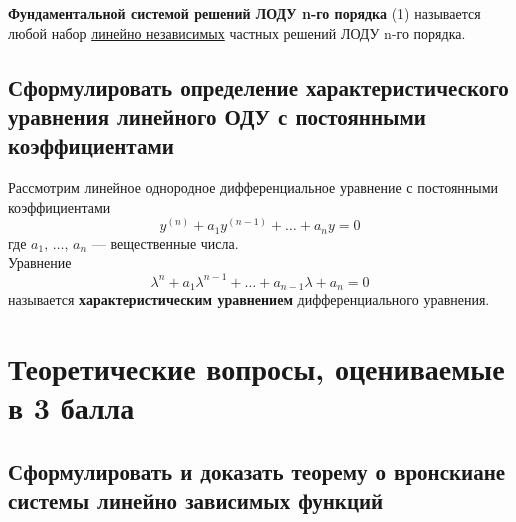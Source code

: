 \begin{definition*}
    \textbf{Фундаментальной системой решений ЛОДУ n-го порядка} (1) называется любой набор \underline{линейно независимых} частных решений ЛОДУ n-го порядка.
\end{definition*}

\newpage
\subsection{Сформулировать определение характеристического уравнения линейного ОДУ с постоянными коэффициентами}

\begin{definition*}
    Рассмотрим линейное однородное дифференциальное уравнение с постоянными коэффициентами
    \[ 
        y^{(n)} + a_1 y^{(n-1)} + \ldots + a_n y = 0
    \]
    где $a_1,\, \ldots,\, a_n$ --- вещественные числа. \\
    Уравнение
    \[
        \lambda^n + a_1 \lambda^{n-1} + \ldots + a_{n-1} \lambda + a_n = 0    
    \]
    называется \textbf{характеристическим уравнением} дифференциального уравнения.
\end{definition*}

\section{Теоретические вопросы, оцениваемые в 3 балла}

\subsection{Сформулировать и доказать теорему о вронскиане системы линейно зависимых функций}

